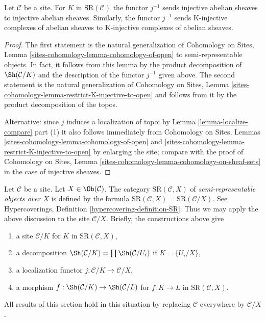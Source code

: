 \begin{lemma}
\label{lemma-localize-injective}
Let $\mathcal{C}$ be a site. For $K$ in $\text{SR}(\mathcal{C})$
the functor $j^{-1}$ sends injective abelian sheaves to injective
abelian sheaves. Similarly, the functor $j^{-1}$ sends K-injective
complexes of abelian sheaves to K-injective complexes of
abelian sheaves.
\end{lemma}

\begin{proof}
The first statement is the natural generalization of
Cohomology on Sites, Lemma
\ref{sites-cohomology-lemma-cohomology-of-open}
to semi-representable objects.
In fact, it follows from this lemma
by the product decomposition of $\Sh(\mathcal{C}/K)$
and the description of the functor $j^{-1}$ given above.
The second statement is the natural generalization of
Cohomology on Sites, Lemma
\ref{sites-cohomology-lemma-restrict-K-injective-to-open}
and follows from it by the product decomposition of the topos.

\medskip\noindent
Alternative: since $j$ induces a localization of topoi by
Lemma \ref{lemma-localize-compare} part (1)
it also follows immediately from
Cohomology on Sites, Lemmas \ref{sites-cohomology-lemma-cohomology-of-open}
and \ref{sites-cohomology-lemma-restrict-K-injective-to-open}
by enlarging the site; compare with the proof of
Cohomology on Sites, Lemma
\ref{sites-cohomology-lemma-cohomology-on-sheaf-sets}
in the case of injective sheaves.
\end{proof}

\begin{remark}
\label{remark-semi-representable-over-object}
Let $\mathcal{C}$ be a site. Let $X \in \Ob(\mathcal{C})$.
The category $\text{SR}(\mathcal{C}, X)$
of {\it semi-representable objects over $X$}
is defined by the formula
$\text{SR}(\mathcal{C}, X) = \text{SR}(\mathcal{C}/X)$.
See Hypercoverings, Definition \ref{hypercovering-definition-SR}.
Thus we may apply the above discussion to the site
$\mathcal{C}/X$. Briefly, the constructions above give
\begin{enumerate}
\item a site $\mathcal{C}/K$ for $K$ in $\text{SR}(\mathcal{C}, X)$,
\item a decomposition
$\Sh(\mathcal{C}/K) = \prod \Sh(\mathcal{C}/U_i)$ if $K = \{U_i/X\}$,
\item a localization functor $j : \mathcal{C}/K \to \mathcal{C}/X$,
\item a morphism $f : \Sh(\mathcal{C}/K) \to \Sh(\mathcal{C}/L)$
for $f : K \to L$ in $\text{SR}(\mathcal{C}, X)$.
\end{enumerate}
All results of this section hold in this situation by replacing
$\mathcal{C}$ everywhere by $\mathcal{C}/X$.
\end{remark}

